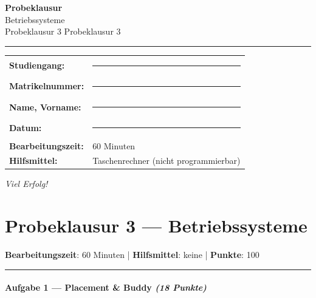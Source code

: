 \documentclass[11pt, a4paper]{article}
\providecommand{\nichttitle}{Probeklausur}
\providecommand{\nichtsubtitle}{}
\renewcommand{\nichttitle}{Betriebssysteme}
\renewcommand{\nichtsubtitle}{Probeklausur 3}
\begin{document}
\thispagestyle{empty}
\begin{center}
\vspace*{1cm}
{\Huge\bfseries\color{accent}Probeklausur}\\[8pt]
{\Large\color{accent}\nichttitle}\\[4pt]
\ifx\nichtsubtitle\empty\else
  {\large\color{accent!80!black}\nichtsubtitle}\\[6pt]
\fi
\color{accent}\rule{0.5\linewidth}{1pt}\color{black}
\end{center}

\vspace{1cm}
\begin{tabularx}{\textwidth}{@{}l X@{}}
\textbf{Studiengang:}      & \rule{6cm}{0.4pt} \\[6pt]
\textbf{Matrikelnummer:}    & \rule{6cm}{0.4pt} \\[6pt]
\textbf{Name, Vorname:}    & \rule{6cm}{0.4pt} \\[6pt]
\textbf{Datum:}             & \rule{6cm}{0.4pt} \\[6pt]
\textbf{Bearbeitungszeit:}  & 60 Minuten \\[6pt]
\textbf{Hilfsmittel:}       & Taschenrechner (nicht programmierbar) \\
\end{tabularx}

\vspace{2cm}
\begin{center}
{\large\itshape Viel Erfolg!}
\end{center}

\newpage


\section{Probeklausur 3 — Betriebssysteme}

\textbf{Bearbeitungszeit}: 60 Minuten | \textbf{Hilfsmittel}: keine | \textbf{Punkte}: 100



\noindent\textcolor{rulegray}{\rule{\linewidth}{0.4pt}}


\paragraph{Aufgabe 1 — Placement \& Buddy \textit{(18 Punkte)}}\mbox{}\\[2pt]
\end{document}
